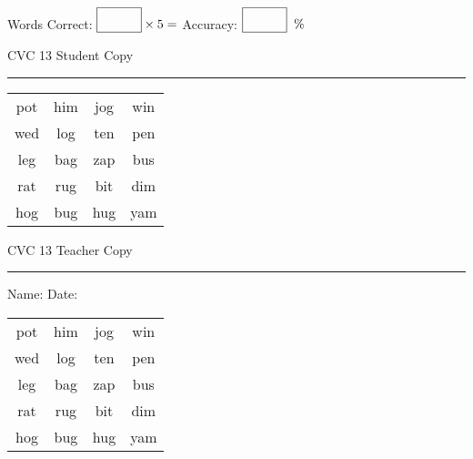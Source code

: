 \documentclass{memoir}
\begin{document}
\normalsize

Words Correct: $\fbox{\phantom{\huge 100}} \times 5 = $ Accuracy: $\fbox{\phantom{\huge 100}}\;\; \%$ 

\vfill

\newpage


\footnotesize \noindent
CVC 13 \hfill Student Copy
\smallskip
\hrule

\huge

\setlength{\tabcolsep}{14pt}
\def\arraystretch{2}

{\selectfont


\begin{vplace}[0.5]
\begin{center}
\begin{tabular}{cccc}
pot & him & jog & win \\
wed & log & ten & pen \\
leg & bag & zap & bus \\
rat & rug & bit & dim \\
hog & bug & hug & yam \\
\end{tabular}
\end{center}
\end{vplace}

}

\newpage

\footnotesize \noindent
CVC 13 \hfill Teacher Copy
\smallskip
\hrule

\normalsize

\vfill

\noindent
Name: \underline{\hspace{1.75in}} \hfill Date: \underline{\hspace{1in}}

\huge

{\selectfont


\begin{vplace}[0.5]
\begin{center}
\begin{tabular}{cccc}
pot & him & jog & win \\
wed & log & ten & pen \\
leg & bag & zap & bus \\
rat & rug & bit & dim \\
hog & bug & hug & yam \\
\end{tabular}
\end{center}
\end{vplace}



}
\end{document}
